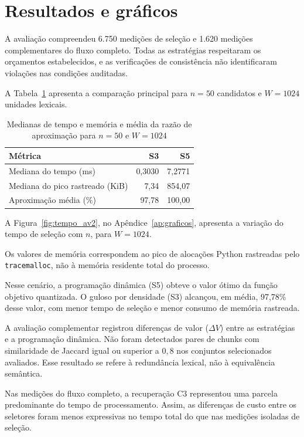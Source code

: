 \documentclass[11pt,a4paper]{article}
\theoremstyle{plain}
\theoremstyle{definition}
\theoremstyle{plain}
\begin{document}
\section{Resultados e gráficos}
\label{sec:resultados}

A avaliação compreendeu 6.750 medições de seleção
e 1.620 medições complementares do fluxo completo.
Todas as estratégias respeitaram os orçamentos
estabelecidos, e as verificações de consistência
não identificaram violações nas condições auditadas.

A Tabela~\ref{tab:av2_resultados} apresenta a
comparação principal para $n=50$ candidatos
e $W=1024$ unidades lexicais.
\begin{table}[htbp]
\centering
\caption{Medianas de tempo e memória e média da razão de aproximação para $n = 50$ e $W = 1024$}
\label{tab:av2_resultados}
\small
\begin{tabular}{lrr}
\hline
\textbf{Métrica} & \textbf{S3} & \textbf{S5} \\
\hline
Mediana do tempo (ms) & 0,3030 & 7,2771 \\
Mediana do pico rastreado (KiB) & 7,34 & 854,07 \\
Aproximação média (\%) & 97,78 & 100,00 \\
\hline
\end{tabular}
\end{table}
A Figura~\ref{fig:tempo_av2}, no
Apêndice~\ref{ap:graficos}, apresenta a
variação do tempo de seleção com $n$,
para $W=1024$.

Os valores de memória correspondem ao pico de
alocações Python rastreadas pelo
\texttt{tracemalloc}, não à memória residente
total do processo.

Nesse cenário, a programação dinâmica (S5)
obteve o valor ótimo da função objetivo
quantizada. O guloso por densidade (S3)
alcançou, em média, 97,78\% desse valor,
com menor tempo de seleção e menor
consumo de memória rastreada.

A avaliação complementar registrou diferenças
de valor ($\Delta V$) entre as estratégias
e a programação dinâmica. Não foram detectados
pares de chunks com similaridade de Jaccard
igual ou superior a $0{,}8$ nos conjuntos
selecionados avaliados. Esse resultado
se refere à redundância lexical, não
à equivalência semântica.

Nas medições do fluxo completo, a recuperação
C3 representou uma parcela predominante do
tempo de processamento. Assim, as diferenças
de custo entre os seletores foram menos
expressivas no tempo total do que nas medições
isoladas de seleção.
\end{document}
